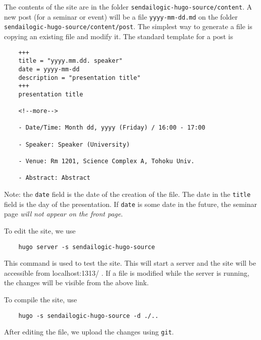 \documentclass[a4paper]{article}
\begin{document}
The contents of the site are in the folder \texttt{sendailogic-hugo-source/content}.
A new post (for a seminar or event) will be a file \texttt{yyyy-mm-dd.md} on the folder \texttt{sendailogic-hugo-source/content/post}.
The simplest way to generate a file is copying an existing file and modify it.
The standard template for a post is
\begin{verbatim}
    +++
    title = "yyyy.mm.dd. speaker"
    date = yyyy-mm-dd
    description = "presentation title"
    +++
    presentation title

    <!--more-->

    - Date/Time: Month dd, yyyy (Friday) / 16:00 - 17:00

    - Speaker: Speaker (University)

    - Venue: Rm 1201, Science Complex A, Tohoku Univ.

    - Abstract: Abstract
\end{verbatim}
Note: the \texttt{date} field is the date of the creation of the file.
The date in the \texttt{title} field is the day of the presentation.
If \texttt{date} is some date in the future, the seminar page {\em will not appear on the front page}.

To edit the site, we use
\begin{verbatim}
    hugo server -s sendailogic-hugo-source
\end{verbatim}
This command is used to test the site.
This will start a server and the site will be accessible from localhost:1313/ .
If a file is modified while the server is running, the changes will be visible from the above link.

To compile the site, use
\begin{verbatim}
    hugo -s sendailogic-hugo-source -d ./..
\end{verbatim}
After editing the file, we upload the changes using \texttt{git}.




\end{document}
